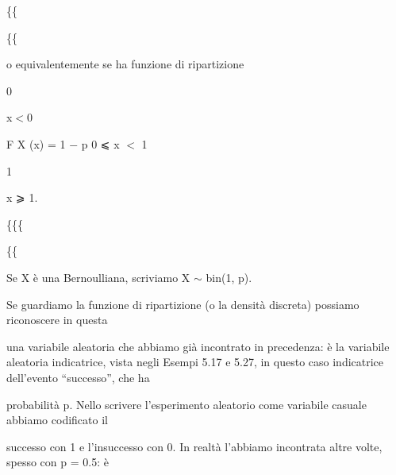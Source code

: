 \documentclass[a4paper,portrait,12pt]{article}
\begin{document}
\{\{


\{\{





\begin{flushleft}
o equivalentemente se ha funzione di ripartizione
\end{flushleft}


0


\begin{flushleft}
x$<$0
\end{flushleft}


\begin{flushleft}
F X (x) = 1 $-$ p 0 ⩽ x $<$ 1
\end{flushleft}


1


\begin{flushleft}
x ⩾ 1.
\end{flushleft}





\{\{\{


\{\{





\begin{flushleft}
Se X \`{e} una Bernoulliana, scriviamo X $\sim$ bin(1, p).
\end{flushleft}


\begin{flushleft}
Se guardiamo la funzione di ripartizione (o la densit\`{a} discreta) possiamo riconoscere in questa
\end{flushleft}


\begin{flushleft}
una variabile aleatoria che abbiamo gi\`{a} incontrato in precedenza: \`{e} la variabile aleatoria indicatrice, vista negli Esempi 5.17 e 5.27, in questo caso indicatrice dell'evento {``}successo'', che ha
\end{flushleft}


\begin{flushleft}
probabilit\`{a} p. Nello scrivere l'esperimento aleatorio come variabile casuale abbiamo codificato il
\end{flushleft}


\begin{flushleft}
successo con 1 e l'insuccesso con 0. In realt\`{a} l'abbiamo incontrata altre volte, spesso con p = 0.5: \`{e}
\end{flushleft}
\end{document}
